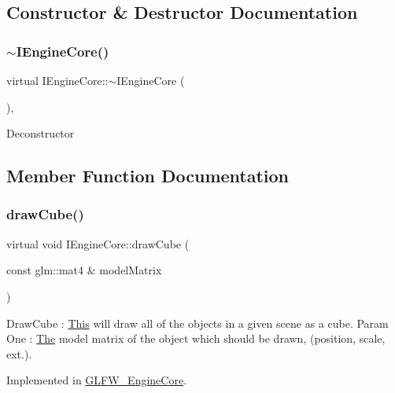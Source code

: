 \subsection{Constructor \& Destructor Documentation}
\mbox{\label{class_i_engine_core_a500720d444543140a1f4f1f80e03d87a}} 
\subsubsection{\texorpdfstring{$\sim$\+I\+Engine\+Core()}{~IEngineCore()}}
{\footnotesize\ttfamily virtual I\+Engine\+Core\+::$\sim$\+I\+Engine\+Core (\begin{DoxyParamCaption}{ }\end{DoxyParamCaption})\hspace{0.3cm}{\ttfamily [inline]}, {\ttfamily [virtual]}}

Deconstructor 

\subsection{Member Function Documentation}
\mbox{\label{class_i_engine_core_af24745492d6a7c8bd410a6849fbaf854}} 
\subsubsection{\texorpdfstring{draw\+Cube()}{drawCube()}}
{\footnotesize\ttfamily virtual void I\+Engine\+Core\+::draw\+Cube (\begin{DoxyParamCaption}\item[{const glm\+::mat4 \&}]{model\+Matrix }\end{DoxyParamCaption})\hspace{0.3cm}{\ttfamily [pure virtual]}}

Draw\+Cube \+: \mbox{\hyperlink{class_this}{This}} will draw all of the objects in a given scene as a cube. Param One \+: \mbox{\hyperlink{class_the}{The}} model matrix of the object which should be drawn, (position, scale, ext.). 

Implemented in \mbox{\hyperlink{class_g_l_f_w___engine_core_a728d1f6ffd1e8526611ab0856db537c0}{G\+L\+F\+W\+\_\+\+Engine\+Core}}.

